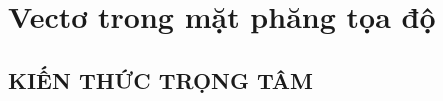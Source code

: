 \newpage
\setcounter{section}{09}
\section{Vectơ trong mặt phăng tọa độ}
\subsection{KIẾN THỨC TRỌNG TÂM}
